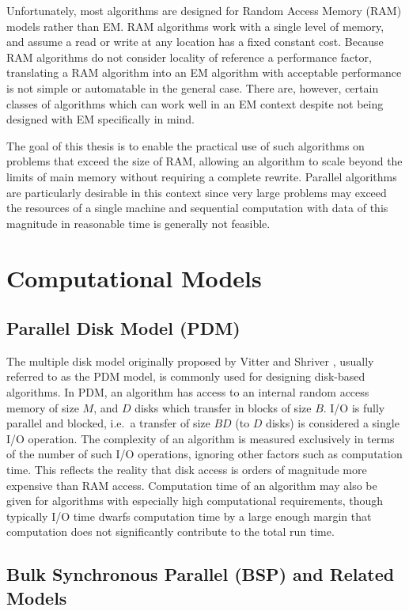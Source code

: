 \documentclass[12pt]{carletoncsthesis}
\begin{document}
Unfortunately, most algorithms are designed for Random Access Memory (RAM)
models rather than EM.  RAM algorithms work with a single level of memory,
and assume a read or write at any location has a fixed constant cost.
Because RAM algorithms do not consider locality of reference a performance
factor, translating a RAM algorithm into an EM algorithm with acceptable
performance is not simple or automatable in the general case.  There are,
however, certain classes of algorithms which can work well in an EM context
despite not being designed with EM specifically in mind.

The goal of this thesis is to enable the practical use of such algorithms
on problems that exceed the size of RAM, allowing an algorithm to scale
beyond the limits of main memory without requiring a complete rewrite.
Parallel algorithms are particularly desirable in this context since very
large problems may exceed the resources of a single machine and sequential
computation with data of this magnitude in reasonable time is generally
not feasible.

\section{Computational Models}


\subsection{Parallel Disk Model (PDM)}


The multiple disk model originally proposed by Vitter and Shriver
\cite{pdm1}\cite{pdm2}, usually referred to as the PDM model, is commonly
used for designing disk-based algorithms.  In PDM, an algorithm has access
to an internal random access memory of size $M$, and $D$ disks which transfer
in blocks of size $B$.  I/O is fully parallel and blocked, i.e.\ a transfer of
size $BD$ (to $D$ disks) is considered a single I/O operation.  The complexity
of an algorithm is measured exclusively in terms of the number of such I/O
operations, ignoring other factors such as computation time.  This reflects
the reality that disk access is orders of magnitude more expensive than RAM
access.  Computation time of an algorithm may also be given for algorithms
with especially high computational requirements, though typically I/O time
dwarfs computation time by a large enough margin that computation does not
significantly contribute to the total run time.

\subsection{Bulk Synchronous Parallel (BSP) and Related Models}
\end{document}

